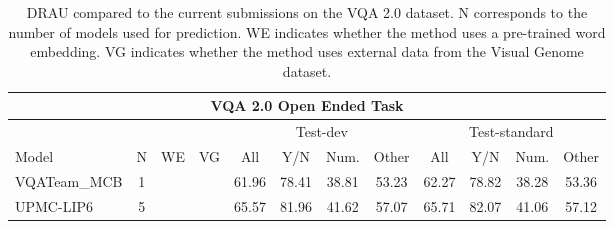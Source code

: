 \documentclass[times,twocolumn, final ,authoryear]{elsarticle}
\begin{document}
  \begin{table*}[t]
  	\center
  	\caption[DRAU compared to the current submissions on the VQA 2.0 dataset]{DRAU compared to the current submissions on the VQA 2.0 dataset. N corresponds to the number of models used for prediction. WE indicates whether the method uses a pre-trained word embedding. VG indicates whether the method uses external data from the Visual Genome dataset.}
  	
  	
  	\begin{tabular}{lccccccccccc}
  		\toprule
  		\multicolumn{12}{c}{VQA 2.0 Open Ended Task} \\
  		\midrule[0.8pt]
  		\multicolumn{4}{c}{}& \multicolumn{4}{c}{Test-dev} & \multicolumn{4}{c}{Test-standard}  \\
  		
  		Model                                  & N  & WE         & VG         & All            & Y/N            & Num.           & Other          & All            & Y/N             & Num.           & Other          \\
  		
  		
  		\cmidrule(r){1-1}   \cmidrule{2-2} \cmidrule{3-4} \cmidrule(l){5-5}  \cmidrule(l){6-8} \cmidrule(l){9-9}  \cmidrule(l){10-12}
  		
  		VQATeam\_MCB \citep{goyal2016}         & 1  & \checkmark & \checkmark & 61.96          & 78.41          & 38.81          & 53.23          & 62.27          & 78.82           & 38.28          & 53.36          \\ %
  		
  		
  		UPMC-LIP6 \citep{ben-younes2017}       & 5  & \checkmark & \checkmark & 65.57          & 81.96          & 41.62          & 57.07          & 65.71          & 82.07           & 41.06          & 57.12          \\ %
  		

\end{tabular}
\end{table*}
\end{document}
